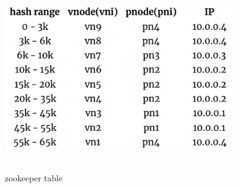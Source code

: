 \begin{figure}[h!]
  \centering
  \includegraphics[width=10cm,height=8cm,keepaspectratio]{../media/crawler/zookeeper_info.png}
  \caption{zookeeper table}
  \label{fig:zookeeper_info}
\end{figure}

\pagebreak